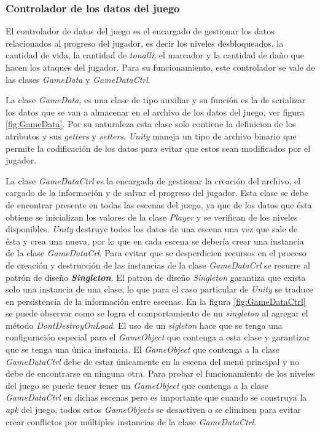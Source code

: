 \subsubsection{Controlador de los datos del juego}
El controlador de datos del juego es el encargado de gestionar los datos 
relacionados al progreso del jugador, es decir los niveles desbloqueados, la 
cantidad de vida, la cantidad de \textit{tonalli}, el marcador y la cantidad de 
daño que hacen los ataques del jugador. Para su funcionamiento, este controlador 
se vale de las clases \textit{GameData} y \textit{GameDataCtrl}.
\\
\par
La clase \textit{GameData}, es una clase de tipo auxiliar y su función es la de 
serializar los datos que se van a almacenar en el archivo de los datos del 
juego, ver figura \ref{fig:GameData}. Por su naturaleza esta clase solo contiene 
la definicion de los atributos y sus \textit{getters} y \textit{setters}. 
\textit{Unity} maneja un tipo de archivo binario que permite la codificación de 
los datos para evitar que estos sean modificados por el jugador.
\\
\par
La clase \textit{GameDataCtrl} es la encargada de gestionar la creación del 
archivo, el cargado de la información y de salvar el progreso del jugador. Esta 
clase se debe de encontrar presente en todas las escenas del juego, ya que de 
los datos que ésta obtiene se inicializan los valores de la clase 
\textit{Player} y se verifican de los niveles disponibles. \textit{Unity} 
destruye todos los datos de una escena una vez que sale de ésta y crea una 
nueva, por lo que en cada escena se debería crear una instancia de la clase 
\textit{GameDataCrl}. Para evitar que se desperdicien recursos en el proceso de 
creación y destrucción de las instancias de la clase \textit{GameDataCrl} se 
recurre al patrón de diseño\textbf{ \textit{Singleton}}. El patron de diseño 
\textit{Singleton} garantiza que exista solo una instancia de una clase, lo que 
para el caso particular de \textit{Unity} se traduce en persistencia de la 
información entre escenas. En la figura \ref{fig:GameDataCtrl} se puede observar 
como se logra el comportamiento de un \textit{singleton} al agregar el método 
\textit{DontDestroyOnLoad}. El uso de un \textit{sigleton} hace que se tenga una 
configuración especial para el \textit{GameObject} que contenga a esta clase y 
garantizar que se tenga una única instancia. El \textit{GameObject} que contenga 
a la clase \textit{GameDataCtrl} debe de estar únicamente en la escena del menú 
principal y no debe de encontrarse en ninguna otra. Para probar el 
funcionamiento de los niveles del juego se puede tener tener un 
\textit{GameObject} que contenga a la clase \textit{GameDataCtrl} en dichas 
escenas pero es importante que cuando se construya la \textit{apk} del juego, 
todos estos \textit{GameObjects} se desactiven o se eliminen para evitar crear 
conflictos por múltiples instancias de la clase \textit{GameDataCtrl}.  

